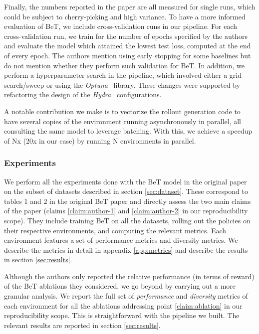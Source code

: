 Finally, the numbers reported in the paper are all measured for single runs, which could be subject to cherry-picking and high variance.
To have a more informed evaluation of BeT, we include cross-validation runs in our pipeline.
For each cross-validation run, we train for the number of epochs specified by the authors and evaluate the model which attained the lowest test loss, computed at the end of every epoch.
The authors mention using early stopping for some baselines but do not mention whether they perform such validation for BeT.
In addition, we perform a hyperparameter search in the pipeline, which involved either a grid search/sweep or using the \textit{Optuna}~\cite{akiba_optuna_2019} library.
These changes were supported by refactoring the design of the \textit{Hydra}~\cite{yadan_hydra_2019} configurations.

A notable contribution we make is to vectorize the rollout generation code to have several copies of the environment running asynchronously in parallel, all consulting the same model to leverage batching.
With this, we achieve a speedup of Nx (20x in our case) by running N environments in parallel.

\subsubsection{Experiments}\label{sec:experiments}

We perform all the experiments done with the BeT model in the original paper on the subset of datasets described in section \ref{sec:dataset}.
These correspond to tables 1 and 2 in the original BeT paper and directly assess the two main claims of the paper (claims \ref{claim:author-1} and \ref{claim:author-2} in our reproducibility scope).
They include training BeT on all the datasets, rolling out the policies on their respective environments, and computing the relevant metrics.
Each environment features a set of performance metrics and diversity metrics.
We describe the metrics in detail in appendix \ref{app:metrics} and describe the results in section \ref{sec:results}.

Although the authors only reported the relative performance (in terms of reward) of the BeT ablations they considered, we go beyond by carrying out a more granular analysis. We report the full set of \emph{performance} and \emph{diversity} metrics of each environment for all the ablations addressing point \ref{claim:ablation} in our reproducibility scope.
This is straightforward with the pipeline we built.
The relevant results are reported in section \ref{sec:results}.

